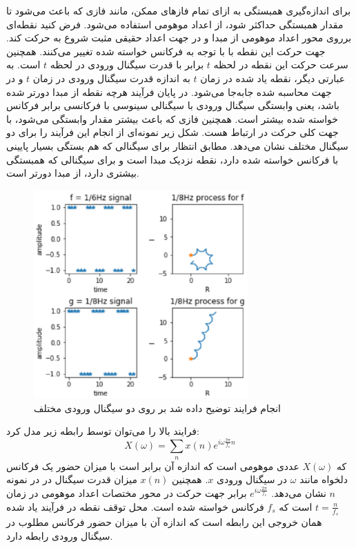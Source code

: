 برای اندازه‌گیری همبستگی به ازای تمام فازهای ممکن، مانند فازی که باعث می‌شود تا
مقدار همبستگی حداکثر شود، از اعداد موهومی استفاده می‌شود. فرض کنید نقطه‌ای برروی
محور اعداد موهومی از مبدا و در جهت اعداد حقیقی مثبت شروع به حرکت کند. جهت حرکت
این نقطه با با توجه به فرکانس خواسته شده تغییر می‌کنند. همچنین سرعت حرکت این
نقطه در لحظه $t$ برابر با قدرت سیگنال ورودی در  لحظه $t$ است. به عبارتی دیگر،
نقطه یاد شده در زمان $t$ به اندازه قدرت سیگنال ورودی در زمان $t$ و در جهت محاسبه
شده جابه‌جا می‌شود. در پایان فرآیند هرچه نقطه از مبدا دورتر شده باشد، یعنی
وابستگی سیگنال ورودی با سیگنالی سینوسی با فرکانسی برابر فرکانس خواسته شده بیشتر
است. همچنین فازی که باعث بیشتر مقدار وابستگی می‌شود، با جهت کلی حرکت در ارتباط
هست. شکل زیر نمونه‌ای از انجام این فرآیند را برای دو سیگنال مختلف نشان می‌دهد.
مطابق انتظار برای سیگنالی که هم بستگی بسیار پایینی با فرکانس خواسته شده دارد،
نقطه نزدیک مبدا است و برای سیگنالی که همبستگی بیشتری دارد، از مبدا دورتر است.
\begin{figure}[ht]
    \centering
    \includegraphics[height=8cm]{./statics/spectral_domain_process.png}
    \caption{انجام فرایند توضیح داده شد بر روی دو سیگنال ورودی مختلف}
\end{figure}

فرایند بالا را می‌توان توسط رابطه زیر مدل کرد:
\begin{equation}
    X(\omega) = \sum_{n} x(n)e^{i \omega \frac{2\pi}{f_s} n}
\end{equation}
که $X(\omega)$ عددی موهومی است که اندازه آن برابر است با میزان حضور یک فرکانس
دلخواه مانند $\omega$ در سیگنال ورودی $x$. همچنین $x(n)$ میزان قدرت سیگنال در در
نمونه $n$ نشان می‌دهد. $e^{i \omega \frac{2\pi}{f_s}}$ برابر جهت حرکت در محور‌
مختصات اعداد موهومی در زمان $t = \frac{n}{f_s}$ است که $f_s$ فرکانس خواسته شده
است. محل توقف نقطه در فرآیند یاد شده همان خروجی این رابطه است که اندازه آن با
میزان حضور فرکانس مطلوب در سیگنال ورودی رابطه دارد.

